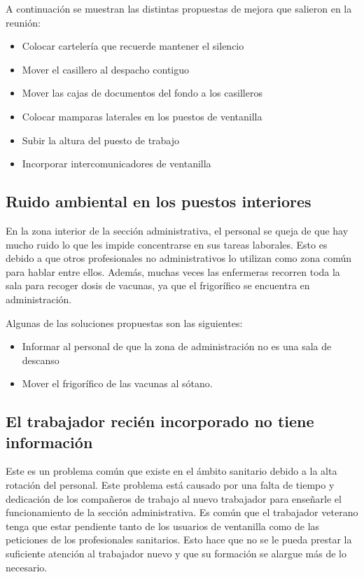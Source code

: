 A continuación se muestran las distintas propuestas de mejora que salieron en la reunión:

\begin{itemize}
    \item Colocar cartelería que recuerde mantener el silencio
    \item Mover el casillero al despacho contiguo
    \item Mover las cajas de documentos del fondo a los casilleros
    \item Colocar mamparas laterales en los puestos de ventanilla
    \item Subir la altura del puesto de trabajo
    \item Incorporar intercomunicadores de ventanilla
\end{itemize}

\subsection{Ruido ambiental en los puestos interiores}

En la zona interior de la sección administrativa, el personal se queja de que hay mucho ruido lo que les impide concentrarse en sus tareas laborales.
Esto es debido a que otros profesionales no administrativos lo utilizan como zona común para hablar entre ellos.
Además, muchas veces las enfermeras recorren toda la sala para recoger dosis de vacunas, ya que el frigorífico se encuentra en administración.

Algunas de las soluciones propuestas son las siguientes:

\begin{itemize}
    \item Informar al personal de que la zona de administración no es una sala de descanso
    \item Mover el frigorífico de las vacunas al sótano.
\end{itemize}

\subsection{El trabajador recién incorporado no tiene información}

Este es un problema común que existe en el ámbito sanitario debido a la alta rotación del personal.
Este problema está causado por una falta de tiempo y dedicación de los compañeros de trabajo al nuevo trabajador para enseñarle el funcionamiento de la sección administrativa. Es común que el trabajador veterano tenga que estar pendiente tanto de los usuarios de ventanilla como de las peticiones de los profesionales sanitarios. Esto hace que no se le pueda prestar la suficiente atención al trabajador nuevo y que su formación se alargue más de lo necesario.

